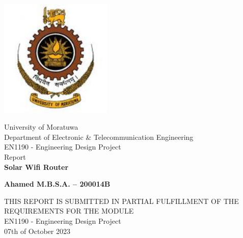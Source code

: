 \documentclass[twocolumn]{article}
\begin{document}
\begin{titlepage}
    \centering
    \vspace*{-2cm}
    \includegraphics[width=0.4\textwidth]{UoM.jpg}
    \vspace{1.5cm}

    {\LARGE University of Moratuwa}\\[0.5cm]
    {\large Department of Electronic \& Telecommunication Engineering}\\[2cm]
    
    {\Large EN1190 - Engineering Design Project}\\[0.5cm]
    {\Large Report}\\[1.5cm]
    
    \textbf{\Large Solar Wifi Router}\\[2cm]
    
    \begin{minipage}{0.4\textwidth}
        \begin{flushleft}
        \centering
            \textbf{\large Ahamed M.B.S.A. – 200014B}\\
        \end{flushleft}
    \end{minipage}
    
    \vfill
    
    {\large THIS REPORT IS SUBMITTED IN PARTIAL FULFILLMENT OF THE REQUIREMENTS FOR THE MODULE}\\[0.5cm]
    {\large EN1190 - Engineering Design Project}\\[0.5cm]
    {\large 07th of October 2023}
    
\end{titlepage}

\begin{abstract}
    We build a Wi-Fi and LED UPS system to work in power cut times or an out place that we can’t get an A/C current source. We design it in a proper way to handle it easily. We provide a 12 V rechargeable battery to charge with an A/C current (converting 230V 
    to 12V) or with a 12 V solar grid power. we use relay to perform in power cut times that     convert the power line to direct battery line. From this process, we can work with Wi- Fi and LED continuously. When we get a direct current line from any sources (A/C or solar) relay automatically convert battery line to power line. Real time we can charge the battery also is one of the benefit from this device. We can manage this process with the switches according to our required function. PCB design with the simple electronic components and enclosure is very user friendly to handle.
\end{abstract}
\end{document}
